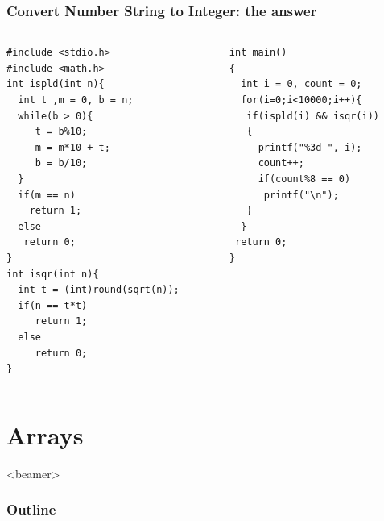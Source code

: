 \ifx\answer{}
\begin{frame}[fragile]
\frametitle{Convert Number String to Integer: the answer}
\vspace{-0.15in}
\begin{columns}
\begin{column}{0.55\linewidth}
\begin{lstlisting}[xleftmargin=0.05\linewidth,linewidth=0.95\linewidth]
#include <stdio.h>
#include <math.h>
int ispld(int n){
  int t ,m = 0, b = n;
  while(b > 0){
     t = b%10;
     m = m*10 + t;
     b = b/10;
  }
  if(m == n)
    return 1;
  else 
   return 0;
}
int isqr(int n){
  int t = (int)round(sqrt(n));
  if(n == t*t)
     return 1;
  else
     return 0;
}
\end{lstlisting}
\end{column}
\begin{column}{0.450\linewidth}
\begin{lstlisting}[firstnumber=14, linewidth=0.95\linewidth]
int main()
{
  int i = 0, count = 0;
  for(i=0;i<10000;i++){
   if(ispld(i) && isqr(i))
   {
     printf("%3d ", i);
     count++;
     if(count%8 == 0)
      printf("\n");
   }
  }
 return 0;
}
\end{lstlisting}
\end{column}
\end{columns}
\end{frame}
\fi

\section{Arrays}
\label{sec:arr}
\begin{frame}<beamer>
    \frametitle{Outline}
    \tableofcontents[currentsection]
\end{frame}

